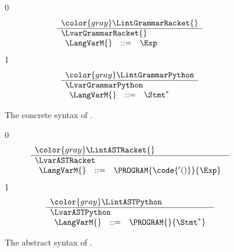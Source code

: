\documentclass[7x10]{TimesAPriori_MIT}%
\newcommand{\gray}[1]{{\color{gray} #1}}
\def\racketEd{0}
\def\pythonEd{1}
\providecommand{\BookEdition}{1}
\let\edition\BookEdition
\newcommand{\pythonColor}[0]{}
\numberwithin{theorem}{chapter}
\numberwithin{definition}{chapter}
\numberwithin{equation}{chapter}
\begin{document}
\begin{figure}[tp]
\centering
\begin{tcolorbox}[colback=white]
{\if\edition\racketEd
\[
\begin{array}{l}
   \gray{\LintGrammarRacket{}} \\ \hline
   \LvarGrammarRacket{}  \\
  \begin{array}{rcl}
    \LangVarM{} &::=& \Exp
  \end{array}
\end{array}
\]
\fi}
{\if\edition\pythonEd\pythonColor
\[
\begin{array}{l}
  \gray{\LintGrammarPython} \\ \hline
  \LvarGrammarPython \\
\begin{array}{rcl}
  \LangVarM{} &::=& \Stmt^{*}
\end{array}
\end{array}
\]
\fi}
\end{tcolorbox}
\caption{The concrete syntax of \LangVar{}.}
\label{fig:Lvar-concrete-syntax}
\end{figure}

\begin{figure}[tp]
\centering
\begin{tcolorbox}[colback=white]
{\if\edition\racketEd
\[
\begin{array}{l}
  \gray{\LintASTRacket{}} \\ \hline
  \LvarASTRacket \\
  \begin{array}{rcl}
    \LangVarM{} &::=& \PROGRAM{\code{'()}}{\Exp}
  \end{array}
\end{array}
\]
\fi}
{\if\edition\pythonEd\pythonColor
  \[
  \begin{array}{l}
  \gray{\LintASTPython}\\ \hline
  \LvarASTPython \\
\begin{array}{rcl}
\LangVarM{}  &::=& \PROGRAM{}{\Stmt^{*}}
\end{array}
\end{array}
\]
\fi}
\end{tcolorbox}
\caption{The abstract syntax of \LangVar{}.}
\label{fig:Lvar-syntax}
\end{figure}
\end{document}
